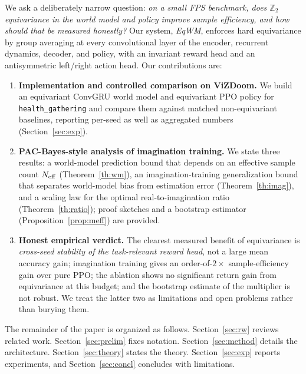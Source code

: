\documentclass[sigconf,anonymous]{acmart}
\begin{document}
We ask a deliberately narrow question: \emph{on a small FPS benchmark, does
$\mathbb Z_2$ equivariance in the world model and policy improve sample
efficiency, and how should that be measured honestly?} Our system,
\emph{EqWM}, enforces hard equivariance by group averaging
\cite{gcnn2016} at every convolutional layer of the encoder, recurrent
dynamics, decoder, and policy, with an invariant reward head and an
antisymmetric left/right action head. Our contributions are:
\begin{enumerate}[leftmargin=*]
  \item \textbf{Implementation and controlled comparison on ViZDoom.} We
        build an equivariant ConvGRU world model and equivariant PPO policy
        for \texttt{health\_gathering} and compare them against matched
        non-equivariant baselines, reporting per-seed as well as aggregated
        numbers (Section~\ref{sec:exp}).
  \item \textbf{PAC-Bayes-style analysis of imagination training.} We state
        three results: a world-model prediction bound that depends on an
        effective sample count $N_{\rm eff}$ (Theorem~\ref{th:wm}), an
        imagination-training generalization bound that separates world-model
        bias from estimation error (Theorem~\ref{th:imag}), and a scaling law
        for the optimal real-to-imagination ratio (Theorem~\ref{th:ratio});
        proof sketches and a bootstrap estimator (Proposition~\ref{prop:meff})
        are provided.
  \item \textbf{Honest empirical verdict.} The clearest measured benefit of
        equivariance is \emph{cross-seed stability of the task-relevant
        reward head}, not a large mean accuracy gain; imagination training
        gives an order-of-$2\times$ sample-efficiency gain over pure
        PPO; the ablation shows no significant return gain from equivariance
        at this budget; and the bootstrap estimate of the multiplier is not
        robust. We treat the latter two as limitations and open problems
        rather than burying them.
\end{enumerate}

The remainder of the paper is organized as follows. Section~\ref{sec:rw}
reviews related work. Section~\ref{sec:prelim} fixes notation.
Section~\ref{sec:method} details the architecture. Section~\ref{sec:theory}
states the theory. Section~\ref{sec:exp} reports experiments, and
Section~\ref{sec:concl} concludes with limitations.

\end{document}
